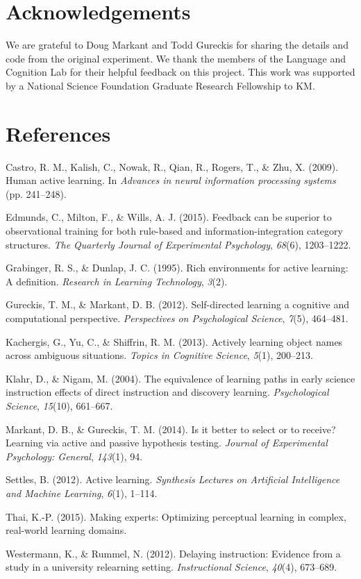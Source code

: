 \documentclass[10pt, letterpaper]{article}
\begin{document}
\section{Acknowledgements}\label{acknowledgements}

We are grateful to Doug Markant and Todd Gureckis for sharing the
details and code from the original experiment. We thank the members of
the Language and Cognition Lab for their helpful feedback on this
project. This work was supported by a National Science Foundation
Graduate Research Fellowship to KM.

\section{References}\label{references}

\setlength{\parindent}{-0.1in} \setlength{\leftskip}{0.125in} \noindent

Castro, R. M., Kalish, C., Nowak, R., Qian, R., Rogers, T., \& Zhu, X.
(2009). Human active learning. In \emph{Advances in neural information
processing systems} (pp. 241--248).

Edmunds, C., Milton, F., \& Wills, A. J. (2015). Feedback can be
superior to observational training for both rule-based and
information-integration category structures. \emph{The Quarterly Journal
of Experimental Psychology}, \emph{68}(6), 1203--1222.

Grabinger, R. S., \& Dunlap, J. C. (1995). Rich environments for active
learning: A definition. \emph{Research in Learning Technology},
\emph{3}(2).

Gureckis, T. M., \& Markant, D. B. (2012). Self-directed learning a
cognitive and computational perspective. \emph{Perspectives on
Psychological Science}, \emph{7}(5), 464--481.

Kachergis, G., Yu, C., \& Shiffrin, R. M. (2013). Actively learning
object names across ambiguous situations. \emph{Topics in Cognitive
Science}, \emph{5}(1), 200--213.

Klahr, D., \& Nigam, M. (2004). The equivalence of learning paths in
early science instruction effects of direct instruction and discovery
learning. \emph{Psychological Science}, \emph{15}(10), 661--667.

Markant, D. B., \& Gureckis, T. M. (2014). Is it better to select or to
receive? Learning via active and passive hypothesis testing.
\emph{Journal of Experimental Psychology: General}, \emph{143}(1), 94.

Settles, B. (2012). Active learning. \emph{Synthesis Lectures on
Artificial Intelligence and Machine Learning}, \emph{6}(1), 1--114.

Thai, K.-P. (2015). Making experts: Optimizing perceptual learning in
complex, real-world learning domains.

Westermann, K., \& Rummel, N. (2012). Delaying instruction: Evidence
from a study in a university relearning setting. \emph{Instructional
Science}, \emph{40}(4), 673--689.
\end{document}
